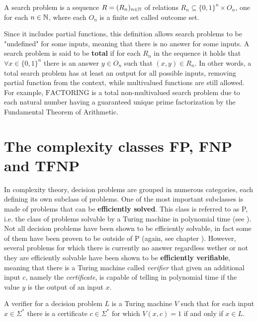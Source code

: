 \begin{definition}
    A search problem is a sequence $R = (R_n)_{n \in \mathbb{N}}$ of relations $R_n \subseteq \{0,1\}^n \times O_n$, one for each $n \in \mathbb{N}$, where each $O_n$ is a finite set called outcome set.
\end{definition}

Since it includes partial functions, this definition allows search problems to be "undefined" for some inputs, meaning that there is no answer for some inputs. A search problem is said to be \textbf{total} if for each $R_n$ in the sequence it holds that $\forall x \in \{0,1\}^n$ there is an answer $y \in O_n$ such that $(x,y) \in R_n$. In other words, a total search problem has at least an output for all possible inputs, removing partial function from the context, while multivalued functions are still allowed. For example, $\mathrm{FACTORING}$ is a total non-multivalued search problem due to each natural number having a guaranteed unique prime factorization by the Fundamental Theorem of Arithmetic.

\newpage

\section{The complexity classes \textsf{FP}, \textsf{FNP} and \textsf{TFNP}}

In complexity theory, decision problems are grouped in numerous categories, each defining its own subclass of problems. One of the most important subclasses is made of problems that can be \textbf{efficiently solved}. This class is referred to as \textsf{P}, i.e. the class of problems solvable by a Turing machine in polynomial time (see ). Not all decision problems have been shown to be efficiently solvable, in fact some of them have been proven to be outside of \textsf{P} (again, see chapter ). However, several problems for which there is currently no answer regardless wether or not they are efficiently solvable have been shown to be \textbf{efficiently verifiable}, meaning that there is a Turing machine called \textit{verifier} that given an additional input $c$, namely the \textit{certificate}, is capable of telling in polynomial time if the value $y$ is the output of an input $x$.

\begin{definition}
    A verifier for a decision problem $L$ is a Turing machine $V$ such that for each input $x \in \Sigma^*$ there is a certificate $c \in \Sigma^*$ for which $V(x,c) = 1$ if and only if $x \in L$.
\end{definition}

